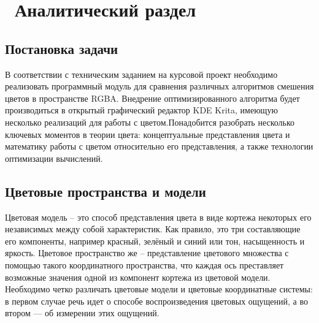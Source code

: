 \chapter{ Аналитический раздел}
\label{cha:analysis}
\section{Постановка задачи}
В соответствии с техническим заданием на курсовой проект необходимо реализовать программный модуль для сравнения различных алгоритмов смешения цветов в пространстве RGBA. Внедрение оптимизированного алгоритма будет производиться в открытый графический редактор KDE Krita, имеющую несколько реализаций для работы с цветом.Понадобится разобрать несколько ключевых моментов в теории цвета: концептуальные представления цвета и  математику работы с цветом относительно его представления, а также технологии оптимизации вычислений.

\section {Цветовые пространства и модели}
Цветовая модель -- это способ представления цвета в виде кортежа некоторых его независимых между собой характеристик. Как правило, это три составляющие его компоненты, например красный, зелёный и синий или тон, насыщенность и яркость. Цветовое пространство же -- представление цветового множества с помощью такого координатного пространства, что каждая ось преставляет возможные значения одной из компонент кортежа из цветовой модели. Необходимо четко различать цветовые модели и цветовые координатные системы: в первом случае речь идет о способе воспроизведения цветовых ощущений, а во втором — об измерении этих ощущений.

